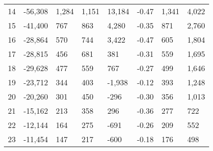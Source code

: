 \begin{appendices}
\begin{longtable}[c]{@{}llllllll@{}}
	14                       & -56,308                       & 1,284                        & 1,151                        & 13,184                   & -0.47                   & 1,341                & 4,022                   \\
	15                       & -41,400                       & 767                          & 863                          & 4,280                    & -0.35                   & 871                  & 2,760                   \\
	16                       & -28,864                       & 570                          & 744                          & 3,422                    & -0.47                   & 605                  & 1,804                   \\
	17                       & -28,815                       & 456                          & 681                          & 381                      & -0.31                   & 559                  & 1,695                   \\
	18                       & -29,628                       & 477                          & 559                          & 767                      & -0.27                   & 499                  & 1,646                   \\
	19                       & -23,712                       & 344                          & 403                          & -1,938                   & -0.12                   & 393                  & 1,248                   \\
	20                       & -20,260                       & 301                          & 450                          & -296                     & -0.30                   & 356                  & 1,013                   \\
	21                       & -15,162                       & 213                          & 358                          & 296                      & -0.36                   & 277                  & 722                     \\
	22                       & -12,144                       & 164                          & 275                          & -691                     & -0.26                   & 209                  & 552                     \\
	23                       & -11,454                       & 147                          & 217                          & -600                     & -0.18                   & 176                  & 498                     \\

\end{longtable}
\end{appendices}
